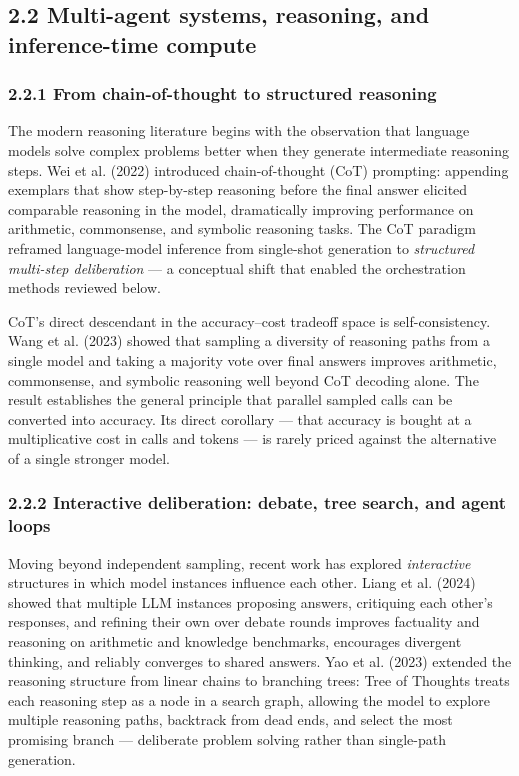 \documentclass[11pt,a4paper]{article}
\begin{document}
\subsection{2.2 Multi-agent systems, reasoning, and inference-time compute}

\subsubsection{2.2.1 From chain-of-thought to structured reasoning}

The modern reasoning literature begins with the observation that language
models solve complex problems better when they generate intermediate
reasoning steps. Wei et al. (2022) introduced chain-of-thought (CoT)
prompting: appending exemplars that show step-by-step reasoning before the
final answer elicited comparable reasoning in the model, dramatically
improving performance on arithmetic, commonsense, and symbolic reasoning
tasks. The CoT paradigm reframed language-model inference from
single-shot generation to \textit{structured multi-step deliberation} — a
conceptual shift that enabled the orchestration methods reviewed below.

CoT's direct descendant in the accuracy–cost tradeoff space is
self-consistency. Wang et al. (2023) showed that sampling a diversity of
reasoning paths from a single model and taking a majority vote over final
answers improves arithmetic, commonsense, and symbolic reasoning well beyond
CoT decoding alone. The result establishes the general principle that
parallel sampled calls can be converted into accuracy. Its direct corollary
— that accuracy is bought at a multiplicative cost in calls and tokens —
is rarely priced against the alternative of a single stronger model.

\subsubsection{2.2.2 Interactive deliberation: debate, tree search, and agent loops}

Moving beyond independent sampling, recent work has explored \textit{interactive}
structures in which model instances influence each other. Liang et al.
(2024) showed that multiple LLM instances proposing answers, critiquing each
other's responses, and refining their own over debate rounds improves
factuality and reasoning on arithmetic and knowledge benchmarks, encourages
divergent thinking, and reliably converges to shared answers. Yao et al.
(2023) extended the reasoning structure from linear chains to branching
trees: Tree of Thoughts treats each reasoning step as a node in a search
graph, allowing the model to explore multiple reasoning paths, backtrack
from dead ends, and select the most promising branch — deliberate problem
solving rather than single-path generation.
\end{document}
